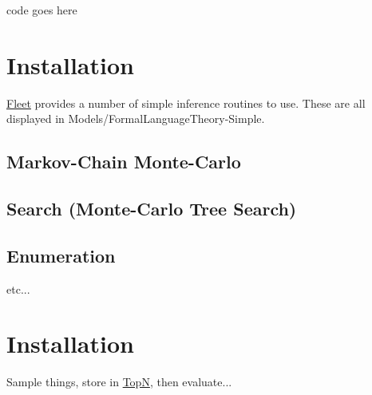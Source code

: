 \begin{DoxyCode}
code goes here
\end{DoxyCode}
\hypertarget{index_install_sec}{}\section{Installation}\label{index_install_sec}
\hyperlink{class_fleet}{Fleet} provides a number of simple inference routines to use. These are all displayed in Models/\+Formal\+Language\+Theory-\/\+Simple.\hypertarget{index_step1}{}\subsection{Markov-\/\+Chain Monte-\/\+Carlo}\label{index_step1}
\hypertarget{index_step2}{}\subsection{Search (\+Monte-\/\+Carlo Tree Search)}\label{index_step2}
\hypertarget{index_step3}{}\subsection{Enumeration}\label{index_step3}
etc...\hypertarget{index_install_sec}{}\section{Installation}\label{index_install_sec}

\begin{DoxyItemize}
\item Sample things, store in \hyperlink{class_top_n}{TopN}, then evaluate... 
\end{DoxyItemize}